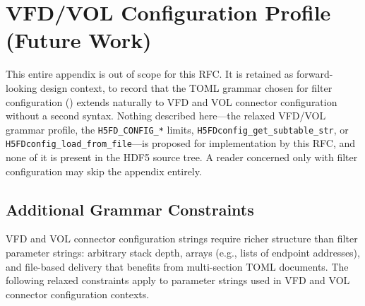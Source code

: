 \documentclass[../RFC-HDFG-2026-001.tex]{subfiles}
\begin{document}
\section{VFD/VOL Configuration Profile (Future Work)}
\label{sec:appendix-vfd}

\begin{outofscope}
This entire appendix is out of scope for this RFC.  It is retained as
forward-looking design context, to record that the TOML grammar chosen for
filter configuration () extends naturally to
VFD and VOL connector configuration without a second syntax.  Nothing
described here---the relaxed VFD/VOL grammar profile, the
\texttt{H5FD\_CONFIG\_*} limits, \texttt{H5FDconfig\_get\_subtable\_str}, or
\texttt{H5FDconfig\_load\_from\_file}---is proposed for implementation by this
RFC, and none of it is present in the HDF5 source tree.  A reader concerned
only with filter configuration may skip the appendix entirely.
\end{outofscope}

\subsection{Additional Grammar Constraints}
\label{sec:vfd-profile-constraints}

VFD and VOL connector configuration strings require richer structure than
filter parameter strings: arbitrary stack depth, arrays (e.g., lists of
endpoint addresses), and file-based delivery that benefits from multi-section
TOML documents.  The following relaxed constraints apply to parameter strings
used in VFD and VOL connector configuration contexts.
\end{document}
